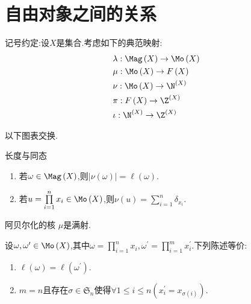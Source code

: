 \section{自由对象之间的关系}

记号约定:设$X$是集合.考虑如下的典范映射:
\begin{align*}
	&\lambda:\Mag\left(X\right)\to\Mo\left(X\right)\\
	&\mu:\Mo\left(X\right)\to F\left(X\right)\\
	&\nu:\Mo\left(X\right)\to\N^{\left(X\right)}\\
	&\pi:F\left(X\right)\to\Z^{\left(X\right)}\\
	&\iota:\N^{\left(X\right)}\to\Z^{\left(X\right)}
\end{align*}

\begin{proposition}{}{}
	以下图表交换.
	\begin{center}
	\end{center}
\end{proposition}

\begin{proposition}{长度与同态}{}
	\begin{enumerate}
		\item 若$\omega\in\Mag\left(X\right)$,则$\left|\nu\left(\omega\right)\right|=\ell\left(\omega\right)$.
		\item 若$u=\prod\limits_{i=1}^{n}x_{i}\in\Mo\left(X\right)$,则$\nu\left(u\right)=\sum\limits_{i=1}^{n}\delta_{x_{i}}$.
	\end{enumerate}
\end{proposition}

\begin{proposition}{阿贝尔化的核}{}
	$\mu$是满射.
\end{proposition}

\begin{proposition}{}{}
	设$\omega,\omega^{\prime}\in\Mo\left(X\right)$,其中$\omega=\prod\limits_{i=1}^{n}x_{i},\omega^{\prime}=\prod\limits_{i=1}^{m}x_{i}^{\prime}$.下列陈述等价:
	\begin{enumerate}
		\item $\ell\left(\omega\right)=\ell\left(\omega^{\prime}\right)$.
		\item $m=n$且存在$\sigma\in\mathfrak{S}_{n}$使得$\forall 1\leq i\leq n\left(x_{i}^{\prime}=x_{\sigma\left(i\right)}\right)$.
	\end{enumerate}
\end{proposition}


